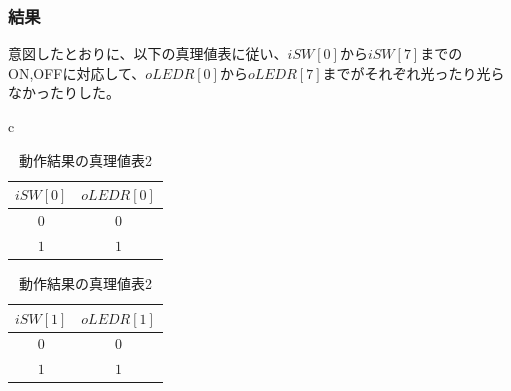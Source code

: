 \documentclass[a4paper]{jarticle}
\begin{document}
\subsubsection{結果}
意図したとおりに、以下の真理値表に従い、$iSW[0]$から$iSW[7]$までのON,OFFに対応して、$oLEDR[0]$から$oLEDR[7]$までがそれぞれ光ったり光らなかったりした。
\begin{table}[!h]
	\begin{center}
		\begin{tabular}{c}
			\begin{minipage}{0.5\hsize}
				\begin{center}
					\caption{動作結果の真理値表1}
					\label{Work1TruthTable1}
					\begin{tabular}{|c|c|}
						\hline
						$iSW[0]$	&$oLEDR[0]$\\	\hline\hline
						$0$		&$0$\\		\hline
						$1$		&$1$\\		\hline
					\end{tabular}
				\end{center}
			\end{minipage}
			\begin{minipage}{0.5\hsize}
				\begin{center}
					\caption{動作結果の真理値表2}
					\label{Work1TruthTable2}
					\begin{tabular}{|c|c|}
						\hline
						$iSW[1]$	&$oLEDR[1]$\\	\hline\hline
						$0$		&$0$\\		\hline
						$1$		&$1$\\		\hline
					\end{tabular}
				\end{center}
			\end{minipage}
		\end{tabular}
	\end{center}
\end{table}
\end{document}
